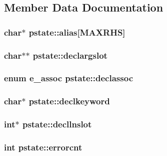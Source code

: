 \subsection{Member Data Documentation}
\hypertarget{structpstate_abdc4136c5eb9156217a5d323cc798b22}{
\subsubsection[{alias}]{\setlength{\rightskip}{0pt plus 5cm}char$\ast$ pstate\-::alias\mbox{[}{\bf M\-A\-X\-R\-H\-S}\mbox{]}}}\label{structpstate_abdc4136c5eb9156217a5d323cc798b22}
\hypertarget{structpstate_ac4efccfc09ac41604466cc899d8ba9bc}{
\subsubsection[{declargslot}]{\setlength{\rightskip}{0pt plus 5cm}char$\ast$$\ast$ pstate\-::declargslot}}\label{structpstate_ac4efccfc09ac41604466cc899d8ba9bc}
\hypertarget{structpstate_a30860ff79023cbc6b234a48bb534f289}{
\subsubsection[{declassoc}]{\setlength{\rightskip}{0pt plus 5cm}enum e\-\_\-assoc pstate\-::declassoc}}\label{structpstate_a30860ff79023cbc6b234a48bb534f289}
\hypertarget{structpstate_ab4bce0a5ad318611ea7fd0e29942a3c4}{
\subsubsection[{declkeyword}]{\setlength{\rightskip}{0pt plus 5cm}char$\ast$ pstate\-::declkeyword}}\label{structpstate_ab4bce0a5ad318611ea7fd0e29942a3c4}
\hypertarget{structpstate_a589bc337728f24498f1d5841067cdfc1}{
\subsubsection[{decllnslot}]{\setlength{\rightskip}{0pt plus 5cm}int$\ast$ pstate\-::decllnslot}}\label{structpstate_a589bc337728f24498f1d5841067cdfc1}
\hypertarget{structpstate_a1c161d486f203af3e5dc6a3259b56079}{
\subsubsection[{errorcnt}]{\setlength{\rightskip}{0pt plus 5cm}int pstate\-::errorcnt}}\label{structpstate_a1c161d486f203af3e5dc6a3259b56079}


